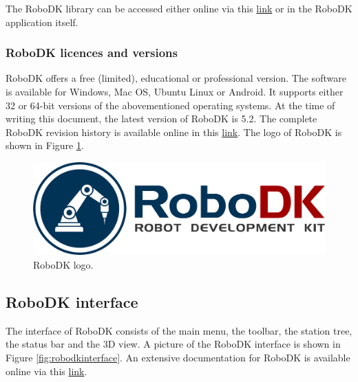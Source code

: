 The RoboDK library can be accessed either online via this \href{https://en.etsmtl.ca/unites-de-recherche/coro/accueil?lang=en-CA}{link}  or in the RoboDK application itself. 

\subsubsection*{RoboDK licences and versions}

RoboDK offers a free (limited), educational or professional version. 
The software is available for Windows, Mac OS, Ubuntu Linux or Android. It supports either 32 or 64-bit versions of the abovementioned operating systems. At the time of writing this document, the latest version of RoboDK is 5.2. The complete RoboDK revision history is available online in this \href{https://en.etsmtl.ca/unites-de-recherche/coro/accueil?lang=en-CA}{link}. The logo of RoboDK is shown in Figure \ref{fig:robodklogo}.

\begin{figure}[h]
    \centering
    \includegraphics[width=0.6\linewidth]{img/robodk_logo.png}
    \caption{RoboDK logo.}
    \label{fig:robodklogo}
\end{figure}

\subsection{RoboDK interface}

The interface of RoboDK consists of the main menu, the toolbar, the station tree, the status bar and the 3D view. A picture of the RoboDK interface is shown in Figure \ref{fig:robodkinterface}. An extensive documentation for RoboDK is available online via this \href{https://robodk.com/doc/en/Basic-Guide.html#Start}{link}.

